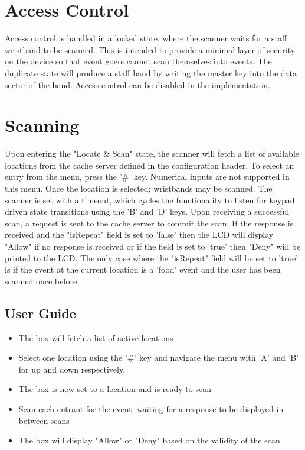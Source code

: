 \documentclass{article}
\begin{document}
\section{Access Control}
Access control is handled in a locked state, where the scanner waits for a staff wristband to be scanned.  This is intended to provide a minimal layer of security on the device so that event goers cannot scan themselves into events.  The duplicate state will produce a staff band by writing the master key into the data sector of the band.  Access control can be disabled in the implementation.

\section{Scanning}
Upon entering the "Locate \& Scan" state, the scanner will fetch a list of available locations from the cache server defined in the configuration header.  To select an entry from the menu, press the '\#' key. Numerical inputs are not supported in this menu.  Once the location is selected; wristbands may be scanned.  The scanner is set with a timeout, which cycles the functionality to listen for keypad driven state transitions using the 'B' and 'D' keys.  Upon receiving a successful scan, a request is sent to the cache server to commit the scan.  If the response is received and the "isRepeat" field is set to 'false' then the LCD will display "Allow" if no response is received or if the field is set to 'true' then "Deny" will be printed to the LCD.  The only case where the "isRepeat" field will be set to 'true' is if the event at the current location is a 'food' event and the user has been scanned once before.  
\subsection{User Guide}
\begin{itemize}
	\item The box will fetch a list of active locations
	\item Select one location using the '\#' key and navigate the menu with 'A' and 'B' for up and down respectively.
	\item The box is now set to a location and is ready to scan
	\item Scan each entrant for the event, waiting for a response to be displayed in between scans
	\item The box will display "Allow" or "Deny" based on the validity of the scan
\end{itemize}
\end{document}
